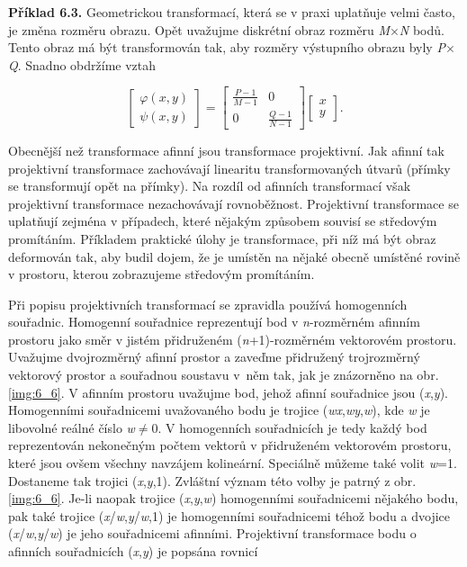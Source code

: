 \noindent \textbf{Příklad 6.3.} Geometrickou transformací, která se v praxi uplatňuje velmi často, je změna rozměru obrazu. Opět uvažujme diskrétní obraz rozměru \textit{M}$\times$\textit{N} bodů. Tento obraz má být transformován tak, aby rozměry výstupního obrazu byly \textit{P}$\times$\textit{Q}. Snadno obdržíme vztah

\begin{equation}
    \left[\begin{array}{c} {\varphi \left(x,y\right)} \\ {\psi \left(x,y\right)} \end{array}\right]=\left[\begin{array}{cc} {\frac{P-1}{M-1} } & {0} \\ {0} & {\frac{Q-1}{N-1} } \end{array}\right]\left[\begin{array}{c} {x} \\ {y} \end{array}\right].\nonumber
\end{equation}

Obecnější než transformace afinní jsou transformace projektivní. Jak afinní tak projektivní transformace zachovávají linearitu transformovaných útvarů (přímky se transformují opět na přímky). Na rozdíl od afinních transformací však projektivní transformace nezachovávají rovnoběžnost. Projektivní transformace se uplatňují zejména v případech, které nějakým způsobem souvisí se středovým promítáním. Příkladem praktické úlohy je transformace, při níž má být obraz deformován tak, aby budil dojem, že je umístěn na nějaké obecně umístěné rovině v prostoru, kterou zobrazujeme středovým promítáním.

Při popisu projektivních transformací se zpravidla používá homogenních souřadnic. Homogenní souřadnice reprezentují bod v \textit{n}-rozměrném afinním prostoru jako směr v jistém přidruženém (\textit{n}+1)-rozměrném vektorovém prostoru. Uvažujme dvojrozměrný afinní prostor a zaveďme přidružený trojrozměrný vektorový prostor a souřadnou soustavu v~něm tak, jak je znázorněno na obr. \ref{img:6_6}. V afinním prostoru uvažujme bod, jehož afinní souřadnice jsou (\textit{x},\textit{y}). Homogenními souřadnicemi uvažovaného bodu je trojice (\textit{wx},\textit{wy},\textit{w}), kde \textit{w} je libovolné reálné číslo \textit{w}$\neq$0. V homogenních souřadnicích je tedy každý bod reprezentován nekonečným počtem vektorů v přidruženém vektorovém prostoru, které jsou ovšem všechny navzájem kolineární. Speciálně můžeme také volit \textit{w}=1. Dostaneme tak trojici (\textit{x},\textit{y},1). Zvláštní význam této volby je patrný z obr. \ref{img:6_6}. Je-li naopak trojice (\textit{x},\textit{y},\textit{w}) homogenními souřadnicemi nějakého bodu, pak také trojice (\textit{x}/\textit{w},\textit{y}/\textit{w},1) je homogenními souřadnicemi téhož bodu a dvojice (\textit{x}/\textit{w},\textit{y}/\textit{w}) je jeho souřadnicemi afinními. Projektivní transformace bodu o afinních souřadnicích (\textit{x},\textit{y}) je popsána rovnicí

